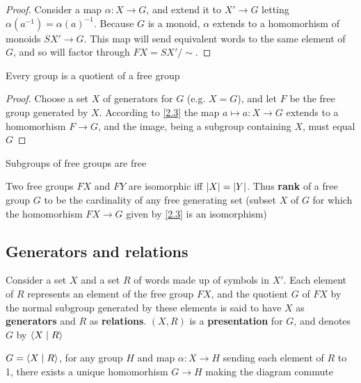 \documentclass[11pt]{article}
\begin{document}
\begin{proof}
Consider a map \(\alpha:X\to G\), and extend it to \(X'\to G\) letting \(\alpha(a^{-1})=\alpha(a)^{-1}\).
Because \(G\) is a monoid, \(\alpha\) extends to a homomorhism of monoids \(SX'\to G\). This map will send
equivalent words to the same element of \(G\), and so will factor through \(FX=SX'/\sim\).
\end{proof}

\begin{corollary}[]
Every group is a quotient of a free group
\end{corollary}

\begin{proof}
Choose a set \(X\) of generators for \(G\) (e.g. \(X=G\)), and let \(F\) be the free group
generated by \(X\). According to \ref{2.3} the map \(a\mapsto a:X\to G\)  extends to a
homomorhism \(F\to G\), and the image, being a subgroup containing \(X\), must equal \(G\)
\end{proof}

\begin{theorem}
Subgroups of free groups are free
\end{theorem}

Two free groups \(FX\) and \(FY\) are isomorphic iff \(\abs{X}=\abs{Y}\). Thus \textbf{rank} of a free
group \(G\) to be the cardinality of any free generating set (subset \(X\) of \(G\) for which
the homomorhism \(FX\to G\) given by \ref{2.3} is an isomorphism)
\subsection{Generators and relations}
\label{sec:org502e9b0}
Consider a set \(X\) and a set \(R\) of words made up of symbols in \(X'\). Each element
of \(R\) represents an element of the free group \(FX\), and the quotient \(G\) of \(FX\) by the
normal subgroup generated by these elements is said to have \(X\) as \textbf{generators} and \(R\) as
\textbf{relations}. \((X,R)\) is a \textbf{presentation} for \(G\), and denotes \(G\) by \(\langle X\mid R\rangle\)

\begin{proposition}[]
\(G=\langle X\mid R\rangle\), for any group \(H\) and map \(\alpha:X\to H\) sending each element of \(R\) to 1, there
exists a unique homomorhism \(G\to H\) making the diagram commute
\begin{center}\end{center}
\end{proposition}
\end{document}
